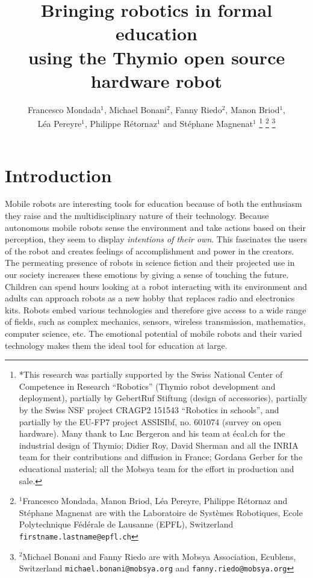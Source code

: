 \documentclass[letterpaper, 10 pt, conference]{ieeeconf}  %
\title{\LARGE \bf
Bringing robotics in formal education \\
using the Thymio open source hardware robot
}
\author{Francesco Mondada$^{1}$, Michael Bonani$^{2}$, Fanny Riedo$^{2}$, Manon Briod$^{1}$, \\
L\'ea Pereyre$^{1}$, Philippe R\'etornaz$^{1}$ and St\'ephane Magnenat$^{1}$%
\thanks{*This research was partially supported by the Swiss National Center of Competence in Research ``Robotics'' (Thymio robot development and deployment), partially by GebertRuf Stiftung (design of accessories), partially by the Swiss NSF project CRAGP2 151543 ``Robotics in schools'', and partially by the EU-FP7 project ASSISIbf, no. 601074 (survey on open hardware). Many thank to Luc Bergeron and his team at écal.ch for the industrial design of Thymio; Didier Roy, David Sherman and all the INRIA team for their contributions and diffusion in France; Gordana Gerber for the educational material; all the Mobsya team for the effort in production and sale.}%
\thanks{$^{1}$Francesco Mondada, Manon Briod, L\'ea Pereyre, Philippe R\'etornaz and St\'ephane Magnenat are with the Laboratoire de Syst\`emes Robotiques,
        Ecole Polytechnique F\'ed\'erale de Lausanne (EPFL), Switzerland
        {\tt\small firstname.lastname@epfl.ch}}%
\thanks{$^{2}$Michael Bonani and Fanny Riedo are with Mobsya Association, Ecublens, Switzerland
        {\tt\small michael.bonani@mobsya.org} and {\tt\small fanny.riedo@mobsya.org}}%
}
\begin{document}
\maketitle
\thispagestyle{empty}
\pagestyle{empty}





\section{Introduction}

Mobile robots are interesting tools for education because of both the enthusiasm they raise and the multidisciplinary nature of their technology.
Because autonomous mobile robots sense the environment and take actions based on their perception, they seem to display \emph{intentions of their own}.
This fascinates the users of the robot and creates feelings of accomplishment and power in the creators.
The permeating presence of robots in science fiction and their projected use in our society increases these emotions by giving a sense of touching the future. %
Children can spend hours looking at a robot interacting with its environment and adults can approach robots as a new hobby that replaces radio and electronics kits.
Robots embed various technologies and therefore give access to a wide range of fields, such as complex mechanics, sensors, wireless transmission, mathematics, computer science, etc.
The emotional potential of mobile robots and their varied technology makes them the ideal tool for education at large.
\end{document}
